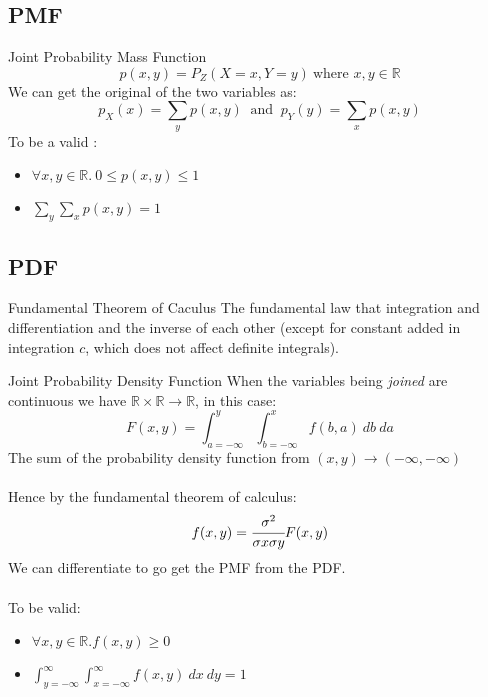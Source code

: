 \subsection{PMF}
\begin{definitionbox}{Joint Probability Mass Function}
	\[p(x,y) = P_Z(X = x, Y = y) \ \text{where } x,y \in \mathbb{R}\]
	We can get the original  of the two variables as:
	\[p_X(x) = \sum_y p(x,y) \ \text{ and } \ p_Y(y) = \sum_x p(x,y)\]
	To be a valid :
	\begin{itemize}
		\item $\forall x,y \in \mathbb{R}. \ 0 \leq p(x,y) \leq 1$
		\item $\sum_y \sum_x p(x,y) = 1$
	\end{itemize}
\end{definitionbox}

\subsection{PDF}
\begin{sidenotebox}{Fundamental Theorem of Caculus}
	The fundamental law that integration and differentiation and the inverse of each other (except for constant added in integration $c$, which does not affect definite integrals).
\end{sidenotebox}

\begin{definitionbox}{Joint Probability Density Function}
	When the variables being \textit{joined} are continuous we have $\mathbb{R} \times \mathbb{R} \to \mathbb{R}$, in this case:
	\[F(x,y) = \int_{a=-\infty}^y \int_{b=-\infty}^x f(b,a) \ db \ da\]
	The sum of the probability density function from $(x,y) \to (-\infty, -\infty)$
	\\
	\\ Hence by the fundamental theorem of calculus:
	\[f(x,y) = \cfrac{\sigma^2}{\sigma x \sigma y }F(x,y)\]
	We can differentiate to go get the PMF from the PDF.
	\\
	\\ To be valid:
	\begin{itemize}
		\item $\forall x, y \in \mathbb{R}. f(x,y) \geq 0\ $
		\item $\int_{y=-\infty}^{\infty} \int_{x=-\infty}^{\infty} f(x,y) \ dx \ dy = 1$
	\end{itemize}
\end{definitionbox}

